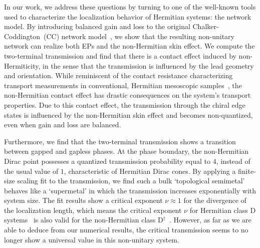 \documentclass[aps,pra,reprint,superscriptaddress,showkeys,amsmath,amssymb,longbibliography]{revtex4-1}
\begin{document}
In our work, we address these questions by turning to one of the well-known tools used to characterize the localization behavior of Hermitian systems: the network model.
By introducing balanced gain and loss to the original Chalker-Coddington~(CC) network model~\cite{Chalker1988}, we show that the resulting non-unitary network can realize both EPs and the non-Hermitian skin effect.
We compute the two-terminal transmission and find that there is a contact effect induced by non-Hermiticity, in the sense that the transmission is influenced by the lead geometry and orientation.
While reminiscent of the contact resistance characterizing transport measurements in conventional, Hermitian mesoscopic samples~\cite{datta1995, imry1997}, the non-Hermitian contact effect has drastic consequences on the system's transport properties.
Due to this contact effect, the transmission through the chiral edge states is influenced by the non-Hermitian skin effect and becomes non-quantized, even when gain and loss are balanced.

Furthermore, we find that the two-terminal transmission shows a transition between gapped and gapless phases.
At the phase boundary, the non-Hermitian Dirac point possesses a quantized transmission probability equal to $4$, instead of the usual value of $1$, characteristic of Hermitian Dirac cones.
By applying a finite-size scaling fit to the transmission, we find such a bulk `topological semimetal' behaves like a `supermetal' in which the transmission increases exponentially with system size.
The fit results show a critical exponent $\nu\approx 1$ for the divergence of the localization length, which means the critical exponent $\nu$ for Hermitian class D systems~\cite{Altland1997,Medvedyeva2010,Ludwig1994} is also valid for the non-Hermitian class D$^\dagger$~\cite{Kawabata2019b}.
However, as far as we are able to deduce from our numerical results, the critical transmission seems to no longer show a universal value in this non-unitary system.
\end{document}
